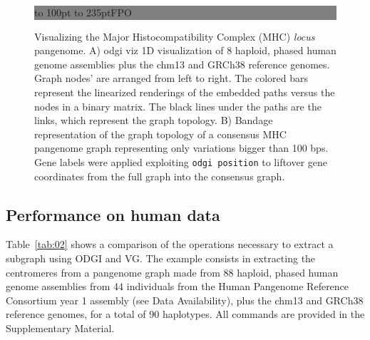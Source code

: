 \documentclass{bioinfo}
\begin{document}
    \begin{figure}[!tpb]%
        \fboxsep=0pt\colorbox{gray}{
            \begin{minipage}[t]{235pt}
                \vbox to 100pt{
                    \vfill\hbox to
                    235pt{\hfill\fontsize{24pt}{24pt}\selectfont FPO\hfill}
                    \vfill
                }
            \end{minipage}}
        \caption{
            Visualizing the Major Histocompatibility Complex (MHC) \textit{locus} pangenome. A) odgi viz 1D
            visualization of 8 haploid, phased human genome assemblies plus the chm13 and GRCh38 reference genomes.
            Graph nodes’ are arranged from left to right. The colored bars represent the linearized renderings of the
            embedded paths versus the nodes in a binary matrix. The black lines under the paths are the links, which
            represent the graph topology. B) Bandage \citep{26099265} representation of the graph topology of a
            consensus MHC pangenome graph representing only variations bigger than 100 bps. Gene labels were applied
            exploiting \texttt{odgi position} to liftover gene coordinates from the full graph into the consensus
            graph.
        }\label{fig:01}
    \end{figure}

    \subsection{Performance on human data}

    Table~\ref{tab:02} shows a comparison of the operations necessary to extract a subgraph using ODGI and VG. The
    example consists in extracting the centromeres from a pangenome graph made from 88 haploid, phased human genome
    assemblies from 44 individuals from the Human Pangenome Reference Consortium year 1 assembly (see Data
    Availability), plus the chm13 and GRCh38 reference genomes, for a total of 90 haplotypes. All commands are provided
    in the Supplementary Material.
\end{document}

